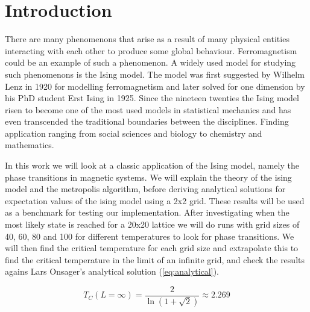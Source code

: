 \section{Introduction}
There are many phenomenons that arise as a result of many physical entities
interacting with each other to produce some global behaviour.
Ferromagnetism could be an example of such a phenomenon. A widely used model for
studying such phenomenons is the Ising model.
The model was first suggested by Wilhelm Lenz in 1920 for modelling ferromagnetism and later solved
for one dimension by his PhD student Erst Ising in 1925. Since the nineteen
twenties the Ising model risen to become one of the most used models in
statistical mechanics and has even
transcended the traditional boundaries between the disciplines. Finding
application ranging from social sciences and biology to chemistry and
mathematics.

In this work we will look at a classic application of the Ising model, namely
the phase transitions in magnetic systems.
We will explain the theory of the ising model and the metropolis algorithm,
before deriving analytical solutions for expectation values of the ising
model using a 2x2 grid. These results will be used as a benchmark for testing
our implementation. After investigating when the most likely state is reached
for a 20x20 lattice we will do runs with grid sizes of 40, 60, 80 and 100
for different temperatures to look for phase transitions.
We will then find the critical temperature for each grid size and extrapolate
this to find the critical temperature in the limit of an infinite grid, and
check the results agains Lars Onsager's analytical solution (\cref{eq:analytical}).

\begin{equation}
  \label{eq:analytical}
  T_C(L=\infty) = \frac{2}{\ln(1 + \sqrt2)} \approx 2.269
\end{equation}



